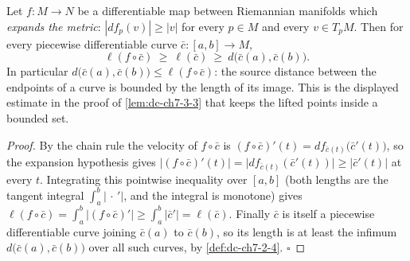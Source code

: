 \begin{lemma}
  \label{lem:dc-ch7-3-3-length-expansion}
  \leanok
  Let $f:M\to N$ be a differentiable map between Riemannian manifolds which
  \emph{expands the metric}: $|df_p(v)|\ge|v|$ for every $p\in M$ and every
  $v\in T_pM$. Then for every piecewise differentiable curve
  $\bar c:[a,b]\to M$,
  $$
  \ell(f\circ\bar c)\ \ge\ \ell(\bar c)\ \ge\ d\big(\bar c(a),\bar c(b)\big).
  $$
  In particular $d\big(\bar c(a),\bar c(b)\big)\le\ell(f\circ\bar c)$: the
  source distance between the endpoints of a curve is bounded by the length of
  its image. This is the displayed estimate in the proof of
  \cref{lem:dc-ch7-3-3} that keeps the lifted points inside a bounded set.
\end{lemma}
\begin{proof}
  \leanok
  By the chain rule the velocity of $f\circ\bar c$ is
  $(f\circ\bar c)'(t)=df_{\bar c(t)}\big(\bar c'(t)\big)$, so the expansion
  hypothesis gives
  $|(f\circ\bar c)'(t)|=\big|df_{\bar c(t)}(\bar c'(t))\big|\ge|\bar c'(t)|$ at
  every $t$. Integrating this pointwise inequality over $[a,b]$ (both lengths
  are the tangent integral $\int_a^b|\,\cdot\,'|$, and the integral is
  monotone) gives
  $\ell(f\circ\bar c)=\int_a^b|(f\circ\bar c)'|\ge\int_a^b|\bar c'|=\ell(\bar c)$.
  Finally $\bar c$ is itself a piecewise differentiable curve joining
  $\bar c(a)$ to $\bar c(b)$, so its length is at least the infimum
  $d\big(\bar c(a),\bar c(b)\big)$ over all such curves, by
  \cref{def:dc-ch7-2-4}. $\square$
\end{proof}

